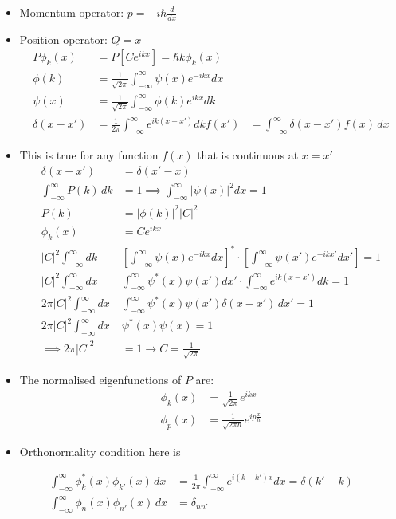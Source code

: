 \documentclass[a4paper,11pt,normalem]{article}
\begin{document}
\begin{itemize}
\item
  Momentum operator: \(p = -i\hbar\frac{d}{dx}\)
\item
  Position operator: \(Q = x\)
\[
    \begin{aligned}
    P\phi_k(x) &= P\left[Ce^{ikx}\right] = \hbar k\phi_k(x) \\
    \phi(k) &= \frac{1}{\sqrt{2\pi}}\int_{-\infty}^{\infty} \psi(x)e^{-ikx}dx \\
    \psi(x) &= \frac{1}{\sqrt{2\pi}}\int_{-\infty}^{\infty} \phi(k)e^{ikx}dk \\
    \delta(x-x') &= \frac{1}{2\pi}\int_{-\infty}^{\infty}e^{ik(x-x')}dk
    f(x') &= \int_{-\infty}^{\infty} \delta(x-x')f(x)\,dx
    \end{aligned}
\]
\item
  This is true for any function \(f(x)\) that is continuous at \(x=x'\)
\[
    \begin{aligned}
    \delta(x-x') &= \delta(x'-x) \\
    \int_{-\infty}^{\infty} P(k)\,dk &= 1 \implies \int_{-\infty}^{\infty} |\psi(x)|^2dx = 1 \\
    P(k) &= |\phi(k)|^2|C|^2 \\
    \phi_k(x) &= Ce^{ikx} \\
    |C|^2\int_{-\infty}^{\infty} dk&\left[\int_{-\infty}^{\infty} \psi(x)e^{-ikx}dx\right]^{ * } \cdot \left[\int_{-\infty}^{\infty}\psi(x')e^{-ikx'}dx'\right] = 1 \\
    |C|^2\int_{-\infty}^{\infty} dx&\int_{-\infty}^{\infty} \psi^* (x)\psi(x') dx' \cdot \int_{-\infty}^{\infty} e^{ik(x-x')}dk = 1 \\
    2\pi|C|^2 \int_{-\infty}^{\infty} dx& \int_{-\infty}^{\infty} \psi^* (x)\psi(x')\delta(x-x')\,dx' = 1 \\
    2\pi|C|^2 \int_{-\infty}^{\infty} dx& \psi^* (x)\psi(x) = 1 \\
    \implies 2\pi|C|^2 &= 1 \to C = \frac{1}{\sqrt{2\pi}}
    \end{aligned}
\]
\item The normalised eigenfunctions of \(P\) are:
\[
    \begin{aligned}
    \phi_k(x) &= \frac{1}{\sqrt{2\pi}}e^{ikx} \\
    \phi_p(x) &= \frac{1}{\sqrt{2\pi\hbar}}e^{ip\frac{x}{\hbar}}
    \end{aligned}
\]
\item
  Orthonormality condition here is
\end{itemize}
\[
    \begin{aligned}
    \int_{-\infty}^{\infty} \phi_k^* (x)\phi_{k'}(x)\,dx &= \frac{1}{2\pi}\int_{-\infty}^{\infty} e^{i(k-k')x}dx = \delta(k'-k) \\
    \int_{-\infty}^{\infty} \phi_n(x)\phi_{n'}(x)\,dx &= \delta_{nn'}
    \end{aligned}
\]
\end{document}
